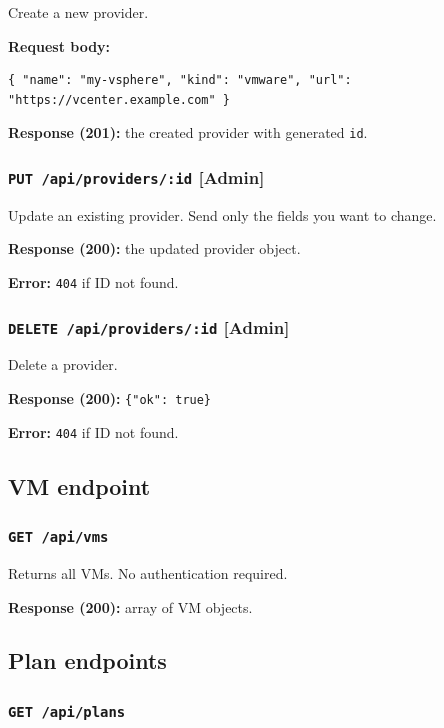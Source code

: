 \documentclass[12pt,a4paper]{article}
\begin{document}
Create a new provider.

\textbf{Request body:}
\begin{lstlisting}[language={}]
{ "name": "my-vsphere", "kind": "vmware", "url": "https://vcenter.example.com" }
\end{lstlisting}

\textbf{Response (201):} the created provider with generated \texttt{id}.

\subsubsection{\texttt{PUT /api/providers/:id} \textnormal{\textbf{[Admin]}}}

Update an existing provider. Send only the fields you want to change.

\textbf{Response (200):} the updated provider object.

\textbf{Error:} \texttt{404} if ID not found.

\subsubsection{\texttt{DELETE /api/providers/:id} \textnormal{\textbf{[Admin]}}}

Delete a provider.

\textbf{Response (200):} \texttt{\{"ok": true\}}

\textbf{Error:} \texttt{404} if ID not found.

\subsection{VM endpoint}

\subsubsection{\texttt{GET /api/vms}}

Returns all VMs. No authentication required.

\textbf{Response (200):} array of VM objects.

\subsection{Plan endpoints}

\subsubsection{\texttt{GET /api/plans}}
\end{document}
